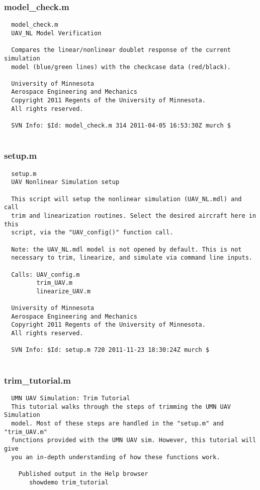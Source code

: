 \documentclass[12pt]{article}
\begin{document}
\subsubsection{model\_check.m}
\begin{verbatim}
  model_check.m
  UAV_NL Model Verification
 
  Compares the linear/nonlinear doublet response of the current simulation 
  model (blue/green lines) with the checkcase data (red/black).
 
  University of Minnesota 
  Aerospace Engineering and Mechanics 
  Copyright 2011 Regents of the University of Minnesota. 
  All rights reserved.
 
  SVN Info: $Id: model_check.m 314 2011-04-05 16:53:30Z murch $


\end{verbatim}

\subsubsection{setup.m}
\begin{verbatim}
  setup.m
  UAV Nonlinear Simulation setup
 
  This script will setup the nonlinear simulation (UAV_NL.mdl) and call
  trim and linearization routines. Select the desired aircraft here in this
  script, via the "UAV_config()" function call.
 
  Note: the UAV_NL.mdl model is not opened by default. This is not
  necessary to trim, linearize, and simulate via command line inputs.
 
  Calls: UAV_config.m
         trim_UAV.m
         linearize_UAV.m
        
  University of Minnesota 
  Aerospace Engineering and Mechanics 
  Copyright 2011 Regents of the University of Minnesota. 
  All rights reserved.
 
  SVN Info: $Id: setup.m 720 2011-11-23 18:30:24Z murch $


\end{verbatim}

\subsubsection{trim\_tutorial.m}
\begin{verbatim}
  UMN UAV Simulation: Trim Tutorial
  This tutorial walks through the steps of trimming the UMN UAV Simulation
  model. Most of these steps are handled in the "setup.m" and "trim_UAV.m"
  functions provided with the UMN UAV sim. However, this tutorial will give
  you an in-depth understanding of how these functions work.

    Published output in the Help browser
       showdemo trim_tutorial


\end{verbatim}
\end{document}

